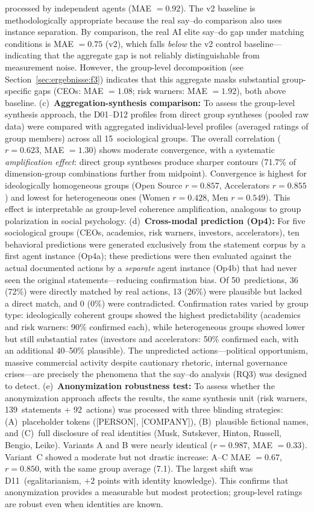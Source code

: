 \documentclass[12pt,a4paper]{article}
\begin{document}
processed by independent agents (MAE $= 0.92$). The v2 baseline is methodologically appropriate because the real say--do comparison also uses instance separation. By comparison, the real AI elite say--do gap under matching conditions is MAE $= 0.75$ (v2), which falls \emph{below} the v2 control baseline---indicating that the aggregate gap is not reliably distinguishable from measurement noise. However, the group-level decomposition (see Section~\ref{sec:ergebnisse:f3}) indicates that this aggregate masks substantial group-specific gaps (CEOs: MAE $= 1.08$; risk warners: MAE $= 1.92$), both above baseline. (c)~\textbf{Aggregation-synthesis comparison:} To assess the group-level synthesis approach, the D01--D12 profiles from direct group syntheses (pooled raw data) were compared with aggregated individual-level profiles (averaged ratings of group members) across all 15~sociological groups. The overall correlation ($r = 0.623$, MAE $= 1.30$) shows moderate convergence, with a systematic \emph{amplification effect}: direct group syntheses produce sharper contours (71.7\% of dimension-group combinations further from midpoint). Convergence is highest for ideologically homogeneous groups (Open Source $r = 0.857$, Accelerators $r = 0.855$) and lowest for heterogeneous ones (Women $r = 0.428$, Men $r = 0.549$). This effect is interpretable as group-level coherence amplification, analogous to group polarization in social psychology. (d)~\textbf{Cross-modal prediction (Op4):} For five sociological groups (CEOs, academics, risk warners, investors, accelerators), ten behavioral predictions were generated exclusively from the statement corpus by a first agent instance (Op4a); these predictions were then evaluated against the actual documented actions by a \emph{separate} agent instance (Op4b) that had never seen the original statements---reducing confirmation bias. Of 50~predictions, 36 (72\%) were directly matched by real actions, 13 (26\%) were plausible but lacked a direct match, and 0 (0\%) were contradicted. Confirmation rates varied by group type: ideologically coherent groups showed the highest predictability (academics and risk warners: 90\% confirmed each), while heterogeneous groups showed lower but still substantial rates (investors and accelerators: 50\% confirmed each, with an additional 40--50\% plausible). The unpredicted actions---political opportunism, massive commercial activity despite cautionary rhetoric, internal governance crises---are precisely the phenomena that the say--do analysis (RQ3) was designed to detect.
(e)~\textbf{Anonymization robustness test:} To assess whether the anonymization approach affects the results, the same synthesis unit (risk warners, 139~statements + 92~actions) was processed with three blinding strategies: (A)~placeholder tokens ([PERSON], [COMPANY]), (B)~plausible fictional names, and (C)~full disclosure of real identities (Musk, Sutskever, Hinton, Russell, Bengio, Leike). Variants A and B were nearly identical ($r = 0.987$, MAE $= 0.33$). Variant~C showed a moderate but not drastic increase: A--C MAE $= 0.67$, $r = 0.850$, with the same group average (7.1). The largest shift was D11~(egalitarianism, $+2$ points with identity knowledge). This confirms that anonymization provides a measurable but modest protection; group-level ratings are robust even when identities are known.
\end{document}
